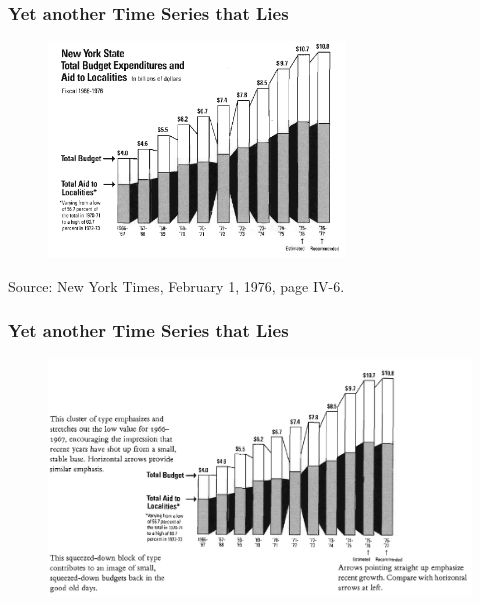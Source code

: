 \documentclass[aspectratio=1610]{beamer}
\begin{document}
\begin{frame}
	\frametitle{Yet another Time Series that Lies}
	\begin{figure}
		\begin{small}
			\begin{center}
				\includegraphics[width=0.7\textwidth]{
					images/nys_budget.png
				}
			\end{center}
		\end{small}
	\end{figure}

	\footnotesize
	Source: New York Times, February 1, 1976, page IV-6.
\end{frame}

\begin{frame}
	\frametitle{Yet another Time Series that Lies}
	\begin{figure}
		\begin{small}
			\begin{center}
				\includegraphics[width=1\textwidth]{
					images/errors.png
				}
			\end{center}
		\end{small}
	\end{figure}
\end{frame}
\end{document}
